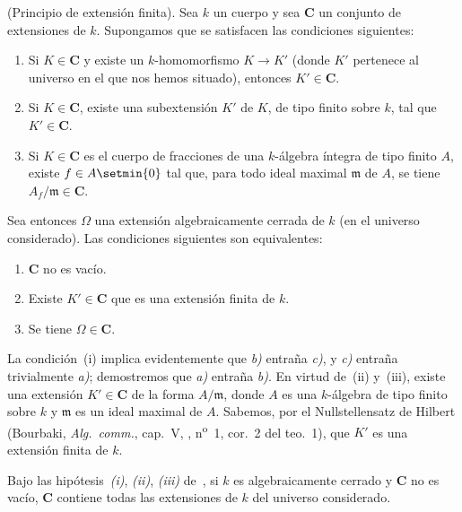 \begin{proposition}[9.1.1]
\label{IV.9.1.1}
\textnormal{(Principio de extensión finita).}
Sea $k$ un cuerpo y sea $\boldsymbol{C}$ un conjunto de extensiones de $k$.
Supongamos que se satisfacen las condiciones siguientes:
\begin{enumerate}[label=\textup{(\roman*)}]
  \item Si $K\in\boldsymbol{C}$ y existe un $k$-homomorfismo $K\to K'$ (donde $K'$ pertenece al universo en el que nos hemos situado), entonces $K'\in\boldsymbol{C}$.
  \item Si $K\in\boldsymbol{C}$, existe una subextensión $K'$ de $K$, de tipo finito sobre $k$, tal que $K'\in\boldsymbol{C}$.
  \item Si $K\in\boldsymbol{C}$ es el cuerpo de fracciones de una $k$-álgebra íntegra de tipo finito $A$, existe $f\in A\setmin\{0\}$ tal que, para todo ideal maximal $\mathfrak{m}$ de $A$, se tiene $A_f/\mathfrak{m}\in\boldsymbol{C}$.
\end{enumerate}


Sea entonces $\Omega$ una extensión algebraicamente cerrada de $k$ (en el universo considerado).
Las condiciones siguientes son equivalentes:
\begin{enumerate}[label=\emph{\alph*)}]
  \item $\boldsymbol{C}$ no es vacío.
  \item Existe $K'\in\boldsymbol{C}$ que es una extensión \textup{finita} de $k$.
  \item Se tiene $\Omega\in\boldsymbol{C}$.
\end{enumerate}
\end{proposition}

La condición~(i) implica evidentemente que \emph{b)} entraña \emph{c)}, y \emph{c)} entraña trivialmente \emph{a)};
demostremos que \emph{a)} entraña \emph{b)}.
En virtud de~(ii) y~(iii), existe una extensión $K'\in\boldsymbol{C}$ de la forma $A/\mathfrak{m}$, donde $A$ es una $k$-álgebra de tipo finito sobre $k$ y $\mathfrak{m}$ es un ideal maximal de $A$.
Sabemos, por el Nullstellensatz de Hilbert (Bourbaki, \emph{Alg.\ comm.}, cap.~V, , n\textsuperscript{o}~1, cor.~2 del teo.~1), que $K'$ es una extensión finita de $k$.

\begin{corollary}[9.1.2]
\label{IV.9.1.2}
Bajo las hipótesis~\emph{(i)}, \emph{(ii)}, \emph{(iii)} de~, si $k$ es algebraicamente cerrado y $\boldsymbol{C}$ no es vacío, $\boldsymbol{C}$ contiene todas las extensiones de $k$ del universo considerado.
\end{corollary}

